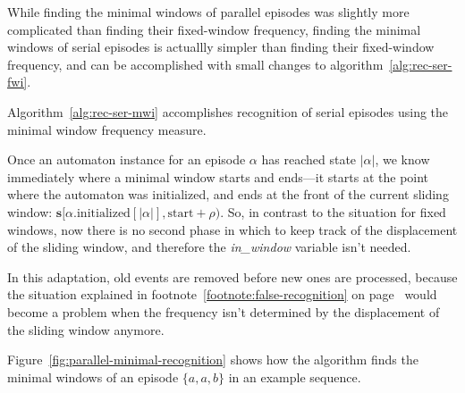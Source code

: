 While finding the minimal windows of parallel episodes was slightly more complicated than finding their fixed-window frequency, finding the minimal windows of serial episodes is actuallly simpler than finding their fixed-window frequency, and can be accomplished with small changes to algorithm~\ref{alg:rec-ser-fwi}.

Algorithm~\ref{alg:rec-ser-mwi} accomplishes recognition of serial episodes using the minimal window frequency measure.

Once an automaton instance for an episode $ \alpha $ has reached state $ | \alpha | $, we know immediately where a minimal window starts and ends---it starts at the point where the automaton was initialized, and ends at the front of the current sliding window: $ \boldsymbol{s}[\alpha \text{.initialized}[| \alpha |], \allowbreak \text{start} + \rho) $. So, in contrast to the situation for fixed windows, now there is no second phase in which to keep track of the displacement of the sliding window, and therefore the \emph{in\_window} variable isn't needed.

In this adaptation, old events are removed before new ones are processed, because the situation explained in footnote~\ref{footnote:false-recognition} on page~\pageref{footnote:false-recognition} would become a problem when the frequency isn't determined by the displacement of the sliding window anymore.


Figure~\ref{fig:parallel-minimal-recognition} shows how the algorithm finds the minimal windows of an episode $ \{ a, a, b \} $ in an example sequence.

